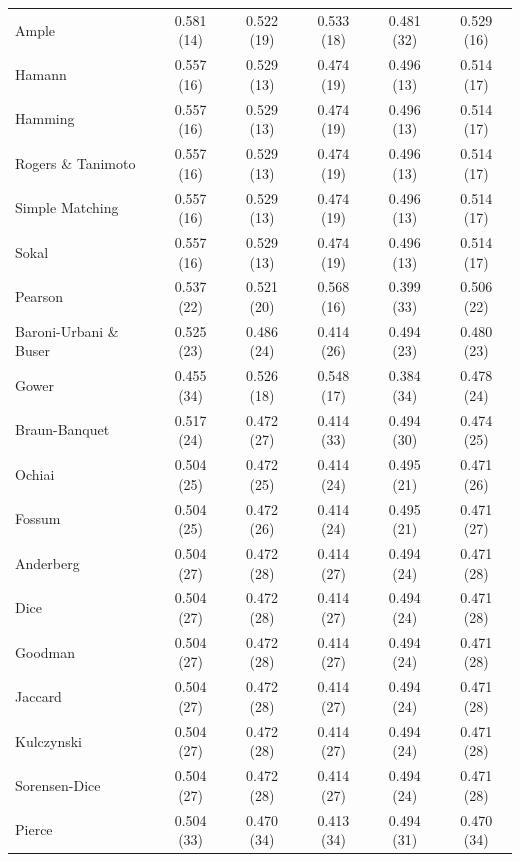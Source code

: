 \begin{table}[t]
{\begin{tabular}{lccccc}
Ample & 0.581 (14) & 0.522 (19) & 0.533 (18) & 0.481 (32) & 0.529 (16) \\
Hamann & 0.557 (16) & 0.529 (13) & 0.474 (19) & 0.496 (13) & 0.514 (17) \\
Hamming & 0.557 (16) & 0.529 (13) & 0.474 (19) & 0.496 (13) & 0.514 (17) \\
Rogers \& Tanimoto & 0.557 (16) & 0.529 (13) & 0.474 (19) & 0.496 (13) & 0.514 (17) \\
Simple Matching & 0.557 (16) & 0.529 (13) & 0.474 (19) & 0.496 (13) & 0.514 (17) \\
Sokal & 0.557 (16) & 0.529 (13) & 0.474 (19) & 0.496 (13) & 0.514 (17) \\
Pearson & 0.537 (22) & 0.521 (20) & 0.568 (16) & 0.399 (33) & 0.506 (22) \\
Baroni-Urbani \& Buser & 0.525 (23) & 0.486 (24) & 0.414 (26) & 0.494 (23) & 0.480 (23) \\
Gower & 0.455 (34) & 0.526 (18) & 0.548 (17) & 0.384 (34) & 0.478 (24) \\
Braun-Banquet & 0.517 (24) & 0.472 (27) & 0.414 (33) & 0.494 (30) & 0.474 (25) \\
Ochiai & 0.504 (25) & 0.472 (25) & 0.414 (24) & 0.495 (21) & 0.471 (26) \\
Fossum & 0.504 (25) & 0.472 (26) & 0.414 (24) & 0.495 (21) & 0.471 (27) \\
Anderberg & 0.504 (27) & 0.472 (28) & 0.414 (27) & 0.494 (24) & 0.471 (28) \\
Dice & 0.504 (27) & 0.472 (28) & 0.414 (27) & 0.494 (24) & 0.471 (28) \\
Goodman & 0.504 (27) & 0.472 (28) & 0.414 (27) & 0.494 (24) & 0.471 (28) \\
Jaccard & 0.504 (27) & 0.472 (28) & 0.414 (27) & 0.494 (24) & 0.471 (28) \\
Kulczynski & 0.504 (27) & 0.472 (28) & 0.414 (27) & 0.494 (24) & 0.471 (28) \\
Sorensen-Dice & 0.504 (27) & 0.472 (28) & 0.414 (27) & 0.494 (24) & 0.471 (28) \\
Pierce & 0.504 (33) & 0.470 (34) & 0.413 (34) & 0.494 (31) & 0.470 (34) \\
\bottomrule
\end{tabular}
}
\end{table}
